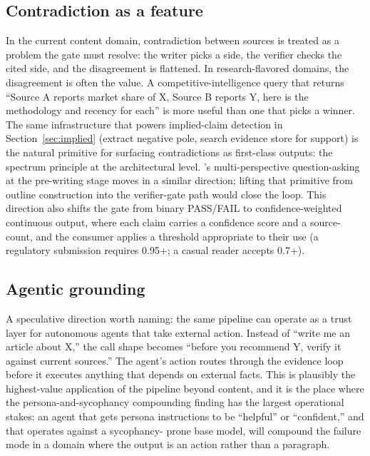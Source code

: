 \documentclass[11pt]{article}
\begin{document}
\subsection{Contradiction as a feature}

In the current content domain, contradiction between sources is treated
as a problem the gate must resolve: the writer picks a side, the
verifier checks the cited side, and the disagreement is flattened. In
research-flavored domains, the disagreement is often the value. A
competitive-intelligence query that returns ``Source A reports market
share of X, Source B reports Y, here is the methodology and recency for
each'' is more useful than one that picks a winner. The same
infrastructure that powers implied-claim detection in
Section~\ref{sec:implied} (extract negative pole, search evidence store
for support) is the natural primitive for surfacing contradictions as
first-class outputs: the spectrum principle at the architectural level.
\citet{shao_storm_2024}'s multi-perspective question-asking at the
pre-writing stage moves in a similar direction; lifting that primitive
from outline construction into the verifier-gate path would close the
loop. This direction also shifts the gate from binary PASS/FAIL to
confidence-weighted continuous output, where each claim carries a
confidence score and a source-count, and the consumer applies a
threshold appropriate to their use (a regulatory submission requires
0.95+; a casual reader accepts 0.7+).

\subsection{Agentic grounding}

A speculative direction worth naming: the same pipeline can operate as
a trust layer for autonomous agents that take external action. Instead
of ``write me an article about X,'' the call shape becomes ``before you
recommend Y, verify it against current sources.'' The agent's action
routes through the evidence loop before it executes anything that
depends on external facts. This is plausibly the highest-value
application of the pipeline beyond content, and it is the place where
the persona-and-sycophancy compounding finding has the largest
operational stakes: an agent that gets persona instructions to be
``helpful'' or ``confident,'' and that operates against a sycophancy-
prone base model, will compound the failure mode in a domain where the
output is an action rather than a paragraph.
\end{document}
